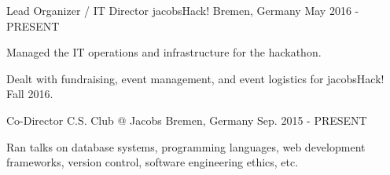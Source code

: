 

\begin{cventries}
  \cventry
    {Lead Organizer / IT Director} %
    {jacobsHack!} %
    {Bremen, Germany} %
    {May 2016 - PRESENT} %
    {
      \begin{cvitems} %
        \item {Managed the IT operations and infrastructure for the hackathon.}
        \item {Dealt with fundraising, event management, and event logistics for jacobsHack! Fall 2016.}
      \end{cvitems}
    }
  \cventry
    {Co-Director} %
    {C.S. Club @ Jacobs} %
    {Bremen, Germany} %
    {Sep. 2015 - PRESENT} %
    {
      \begin{cvitems} %
        \item {Ran talks on database systems, programming languages, web development frameworks, version control, software engineering ethics, etc.}
      \end{cvitems}
    }
\end{cventries}
